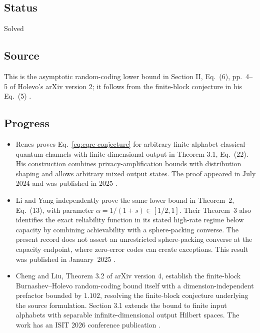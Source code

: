 \subsection*{Status}

Solved

\subsection*{Source}

This is the asymptotic random-coding lower bound in Section II, Eq.~(6), pp.~4–5 of Holevo's arXiv version 2; it follows from the finite-block conjecture in his Eq.~(5) .

\subsection*{Progress}

\begin{itemize}
  \item Renes proves Eq.~\eqref{eq:cqrc-conjecture} for arbitrary finite-alphabet classical–quantum channels with finite-dimensional output in Theorem 3.1, Eq.~(22). His construction combines privacy-amplification bounds with distribution shaping and allows arbitrary mixed output states. The proof appeared in July 2024 and was published in 2025 .

  \item Li and Yang independently prove the same lower bound in Theorem~2, Eq.~(13), with parameter $\alpha=1/(1+s)\in[1/2,1]$. Their Theorem~3 also identifies the exact reliability function in its stated high-rate regime below capacity by combining achievability with a sphere-packing converse. The present record does not assert an unrestricted sphere-packing converse at the capacity endpoint, where zero-error codes can create exceptions. This result was published in January~2025 .

  \item Cheng and Liu, Theorem 3.2 of arXiv version 4, establish the finite-block Burnashev--Holevo random-coding bound itself with a dimension-independent prefactor bounded by $1.102$, resolving the finite-block conjecture underlying the source formulation. Section 3.1 extends the bound to finite input alphabets with separable infinite-dimensional output Hilbert spaces. The work has an ISIT 2026 conference publication .
\end{itemize}

